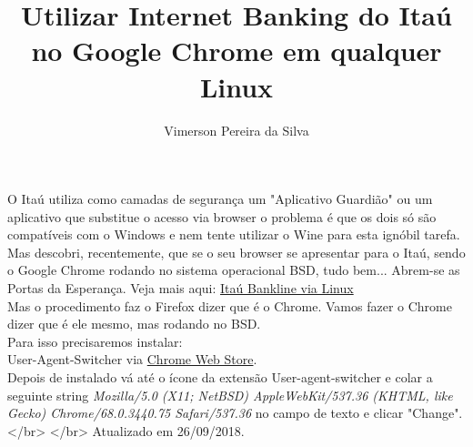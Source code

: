 \documentclass[10pt,a4paper]{article}
\title{Utilizar Internet Banking do Itaú no Google Chrome em qualquer Linux}
\author{Vimerson Pereira da Silva}
\begin{document}
\maketitle
O Itaú utiliza como camadas de segurança um "Aplicativo Guardião" ou um aplicativo que substitue o acesso via browser o problema é que os dois só são compatíveis com o Windows e nem tente utilizar o Wine para esta ignóbil tarefa.\\

Mas descobri, recentemente, que se o seu browser se apresentar para o Itaú, sendo o Google Chrome rodando no sistema operacional BSD, tudo bem... Abrem-se as Portas da Esperança. Veja mais aqui: \href{https://www.vivaolinux.com.br/dica/Acessar-site-do-Itau-Banco-de-qualquer-Linux-2016}{Itaú Bankline via Linux}\\

Mas o procedimento faz o Firefox dizer que é o Chrome. Vamos fazer o Chrome dizer que é ele mesmo, mas rodando no BSD.\\
Para isso precisaremos instalar:\\
User-Agent-Switcher via 
\href{https://chrome.google.com/webstore/detail/user-agent-switcher/lkmofgnohbedopheiphabfhfjgkhfcgf?utm_source=chrome-app-launcher-info-dialog}{Chrome Web Store}.\\

Depois de instalado vá até o ícone da extensão User-agent-switcher e colar a seguinte string \textit{Mozilla/5.0 (X11; NetBSD) AppleWebKit/537.36 (KHTML, like Gecko) Chrome/68.0.3440.75 Safari/537.36} no campo de texto e clicar "Change".</br>
</br>
Atualizado em 26/09/2018.
\end{document}
